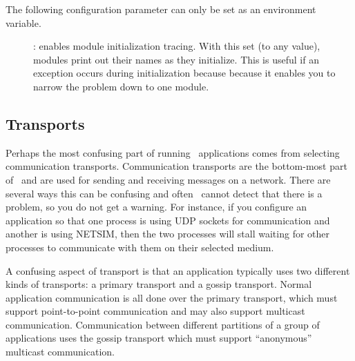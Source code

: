 The following configuration parameter can only be set as an
environment variable.
\begin{description}
\item
[]: enables module initialization tracing.  With this set (to
any value), modules print out their names as they initialize.  This is useful
if an exception  occurs during initialization because because it
enables you to narrow the problem down to one module.
\end{description}

\subsection{Transports}


Perhaps the most confusing part of running \ensemble\ applications
comes from selecting communication transports.  Communication
transports are the bottom-most part of \ensemble\ and are used for
sending and receiving messages on a network.  There are several ways
this can be confusing and often \ensemble\ cannot detect that there is
a problem, so you do not get a warning.  For instance, if you
configure an application so that one process is using UDP sockets for
communication and another is using NETSIM, then the two processes will
stall waiting for other processes to communicate with them on their
selected medium.

A confusing aspect of transport is that an application typically uses
two different kinds of transports: a primary transport and a gossip
transport.  Normal application communication is all done over the
primary transport, which must support point-to-point communication and
may also support multicast communication.  Communication between
different partitions of a group of applications uses the gossip
transport which must support ``anonymous'' multicast communication.

